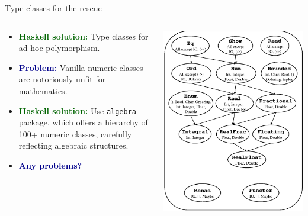 \documentclass[handout]{beamer}
\def\problem{\textcolor{darkblue}{\bf Problem:} }
\def\solution{\textcolor{darkgreen}{\bf Haskell solution:} }
\begin{document}
\begin{frame}{Type classes for the rescue}

\begin{columns}[onlytextwidth,T]
  \begin{column}{.45\linewidth}

\begin{itemize}[<+->]
\item
  \solution
  Type classes for ad-hoc polymorphism.
\item
  \problem
  Vanilla numeric classes
  are notoriously
  unfit for mathematics.
\item
  \solution
  Use {\tt algebra} package, which offers
  a hierarchy of 100+ numeric classes,
  carefully reflecting algebraic structures.

\item
  \textcolor{darkblue}{\bf Any problems?}

\end{itemize}

  \end{column}
  \begin{column}{.5\linewidth}
    \vspace{-2ex}

    \includegraphics[width=1.05\textwidth]{classes.eps}


\end{column}
\end{columns}
\end{frame}
\end{document}
